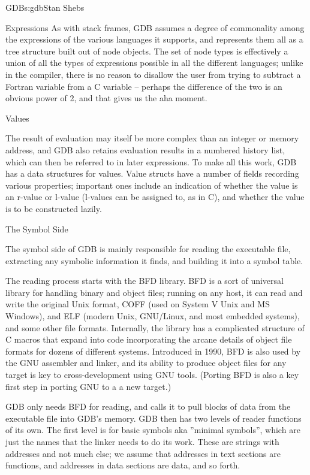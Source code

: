 \begin{aosachapter}{GDB}{s:gdb}{Stan Shebs}
\begin{aosasect2}{Expressions}
As with stack frames, GDB assumes a degree of commonality among the
expressions of the various languages it supports, and represents them
all as a tree structure built out of node objects.  The set of node
types is effectively a union of all the types of expressions possible
in all the different languages; unlike in the compiler, there is no
reason to disallow the user from trying to subtract a Fortran variable
from a C variable -- perhaps the difference of the two is an obvious
power of 2, and that gives us the aha moment.

\end{aosasect2}

\begin{aosasect2}{Values}

The result of evaluation may itself be more complex than an integer or
memory address, and GDB also retains evaluation results in a numbered
history list, which can then be referred to in later expressions.  To
make all this work, GDB has a data structures for values.  Value
structs have a number of fields recording various properties;
important ones include an indication of whether the value is an
r-value or l-value (l-values can be assigned to, as in C), and whether
the value is to be constructed lazily.

\end{aosasect2}

\begin{aosasect1}{The Symbol Side}

The symbol side of GDB is mainly responsible for reading the
executable file, extracting any symbolic information it finds, and
building it into a symbol table.

The reading process starts with the BFD library.  BFD is a sort of
universal library for handling binary and object files; running on any
host, it can read and write the original Unix  format,
COFF (used on System V Unix and MS Windows), and ELF (modern Unix,
GNU/Linux, and most embedded systems), and some other file formats.
Internally, the library has a complicated structure of C macros that
expand into code incorporating the arcane details of object file
formats for dozens of different systems.  Introduced in 1990, BFD is
also used by the GNU assembler and linker, and its ability to produce
object files for any target is key to cross-development using GNU
tools.  (Porting BFD is also a key first step in porting GNU to a
a new target.)

GDB only needs BFD for reading, and calls it to pull blocks of data
from the executable file into GDB's memory.  GDB then has two levels
of reader functions of its own.  The first level is for basic symbols
aka ''minimal symbols'', which are just the names that the linker needs
to do its work.  These are strings with addresses and not much else;
we assume that addresses in text sections are functions, and addresses
in data sections are data, and so forth.


\end{aosasect1}
\end{aosachapter}
